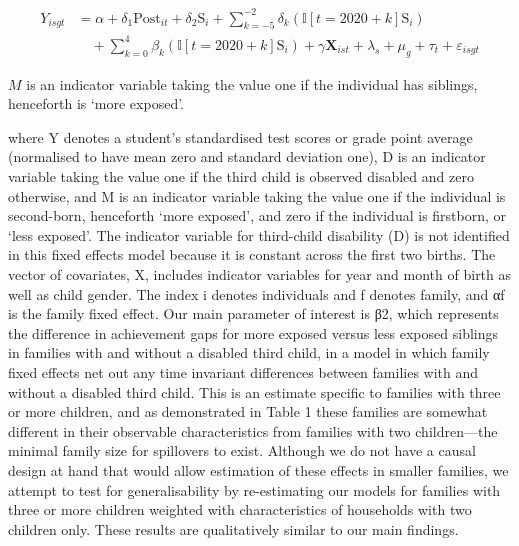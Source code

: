      \begin{align}
    Y_{isgt} &= \alpha + \delta_1 \text{Post}_{it} + \delta_2 \text{S}_{i}   + \sum_{k=-5}^{-2} \delta_k (\mathbb{I}[t = 2020+k] \text{S}_{i}) \nonumber \\
    & \quad + \sum_{k=0}^{4} \beta_k (\mathbb{I}[t = 2020 + k]  \text{S}_{i})  + \gamma\mathbf{X}_{ist} + \lambda_s + \mu_g + \tau_t + \varepsilon_{isgt}
    \end{align}   


$M$ is an indicator variable taking the value one if the individual has siblings, henceforth is ‘more exposed’.
    
where Y denotes a student’s standardised test scores or grade point average (normalised to have mean zero and standard deviation one), D is an indicator variable taking the value one if the third child is observed disabled and zero otherwise, and M is an indicator variable taking the value one if the individual is second-born, henceforth ‘more exposed’, and zero if the individual is firstborn, or ‘less exposed’. The indicator variable for third-child disability (D) is not identified in this fixed effects model because it is constant across the first two births. The vector of covariates, X, includes indicator variables for year and month of birth as well as child gender. The index i denotes individuals and f denotes family, and αf is the family fixed effect. Our main parameter of interest is β2, which represents the difference in achievement gaps for more exposed versus less exposed siblings in families with and without a disabled third child, in a model in which family fixed effects net out any time invariant differences between families with and without a disabled third child. This is an estimate specific to families with three or more children, and as demonstrated in Table 1 these families are somewhat different in their observable characteristics from families with two children—the minimal family size for spillovers to exist. Although we do not have a causal design at hand that would allow estimation of these effects in smaller families, we attempt to test for generalisability by re-estimating our models for families with three or more children weighted with characteristics of households with two children only. These results are qualitatively similar to our main findings.

